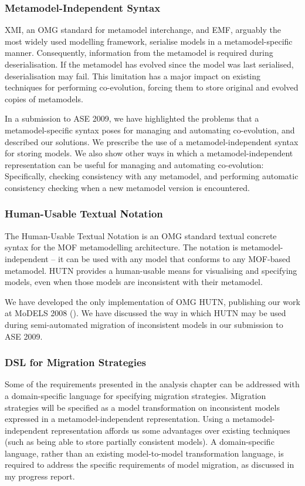 \subsubsection{Metamodel-Independent Syntax}
XMI, an OMG standard for metamodel interchange, and EMF, arguably the most widely used modelling framework, serialise models in a metamodel-specific manner. Consequently, information from the metamodel is required during deserialisation. If the metamodel has evolved since the model was last serialised, deserialisation may fail. This limitation has a major impact on existing techniques for performing co-evolution, forcing them to store original and evolved copies of metamodels. 

In a submission to ASE 2009, we have highlighted the problems that a metamodel-specific syntax poses for managing and automating co-evolution, and described our solutions. We prescribe the use of a metamodel-independent syntax for storing models. We also show other ways in which a metamodel-independent representation can be useful for managing and automating co-evolution: Specifically, checking consistency with any metamodel, and performing automatic consistency checking when a new metamodel version is encountered.

\subsubsection{Human-Usable Textual Notation}
The Human-Usable Textual Notation is an OMG standard textual concrete syntax for the MOF metamodelling architecture. The notation is metamodel-independent -- it can be used with any model that conforms to any MOF-based metamodel. HUTN provides a human-usable means for visualising and specifying models, even when those models are inconsistent with their metamodel.

We have developed the only implementation of OMG HUTN, publishing our work at MoDELS 2008 (\cite{rose08hutn}). We have discussed the way in which HUTN may be used during semi-automated migration of inconsistent models in our submission to ASE 2009.

\subsubsection{DSL for Migration Strategies}
Some of the requirements presented in the analysis chapter can be addressed with a domain-specific language for specifying migration strategies. Migration strategies will be specified as a model transformation on inconsistent models expressed in a metamodel-independent representation. Using a metamodel-independent representation affords us some advantages over existing techniques (such as being able to store partially consistent models). A domain-specific language, rather than an existing model-to-model transformation language, is required to address the specific requirements of model migration, as discussed in my progress report.


